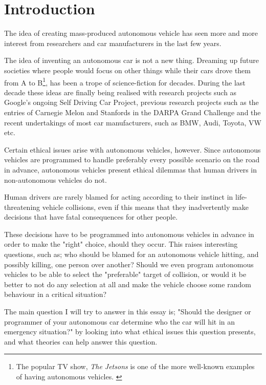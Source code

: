 \chapter{Introduction}

\begin{quote}
\end{quote}

\newpar The idea of creating mass-produced autonomous vehicle has seen more and more interest from researchers and car manufacturers in the last few years.

The idea of inventing an autonomous car is not a new thing. Dreaming up future societies where people would focus on other things while their cars drove them from A to B\footnote{The popular TV show, \textit{The Jetsons} is one of the more well-known examples of having autonomous vehicles. \cite{wiki:jetsons}}, has been a trope of science-fiction for decades. During the last decade these ideas are finally being realised with research projects such as Google's ongoing Self Driving Car Project, previous research projects such as the entries of Carnegie Melon and Stanfords in the DARPA Grand Challenge \cite{wiki:darpachallenge} and the recent undertakings of most car manufacturers, such as BMW, Audi, Toyota, VW etc. \cite{forbes:timeline}

\newpar Certain ethical issues arise with autonomous vehicles, however. Since autonomous vehicles are programmed to handle preferably every possible scenario on the road in advance, autonomous vehicles present ethical dilemmas that human drivers in non-autonomous vehicles do not. 

\newpar Human drivers are rarely blamed for acting according to their instinct in life-threatening vehicle collisions, even if this means that they inadvertently make decisions that have fatal consequences for other people. 

These decisions have to be programmed into autonomous vehicles in advance in order to make the "right" choice, should they occur. 
This raises interesting questions, such as; who should be blamed for an autonomous vehicle hitting, and possibly killing, one person over another? Should we even program autonomous vehicles to be able to select the "preferable" target of collision, or would it be better to not do any selection at all and make the vehicle choose some random behaviour in a critical situation?

The main question I will try to answer in this essay is; "Should the designer or programmer of your autonomous car determine who the car will hit in an emergency situation?" by looking into what ethical issues this question presents, and what theories can help answer this question.  